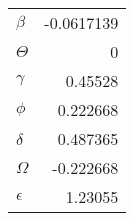 \begin{tabular}{lr}
\hline
 $\beta$    & -0.0617139 \\
 $\Theta$   &  0         \\
 $\gamma$   &  0.45528   \\
 $\phi$     &  0.222668  \\
 $\delta$   &  0.487365  \\
 $\Omega$   & -0.222668  \\
 $\epsilon$ &  1.23055   \\
\hline
\end{tabular}